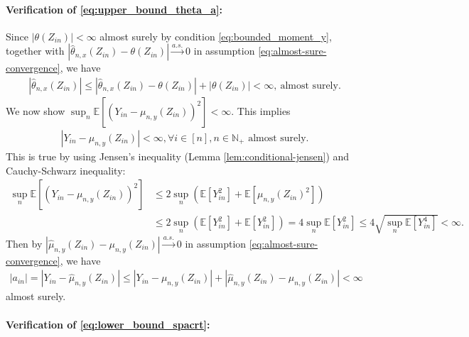 \documentclass[12pt]{article}
\theoremstyle{definition}
\newcommand{\E}{\mathbb E}								%
\newcommand{\srz}{Z}									%
\newcommand{\sry}{Y}									%
\begin{document}
	\paragraph{Verification of \eqref{eq:upper_bound_theta_a}:}
  Since $|\theta(\srz_{in})|<\infty$ almost surely by condition \eqref{eq:bounded_moment_y}, together with $|\widehat \theta_{n,x}(\srz_{in})-\theta(\srz_{in})|\overset{a.s.}{\rightarrow}0$ in assumption \eqref{eq:almost-sure-convergence}, we have
	\begin{align*}
		|\widehat \theta_{n,x}(\srz_{in})|\leq |\widehat \theta_{n,x}(\srz_{in})-\theta(\srz_{in})|+|\theta(\srz_{in})|<\infty,\ \text{almost surely}.
	\end{align*}
	We now show $\sup_n\E[(\sry_{in}-\mu_{n,y}(\srz_{in}))^2]<\infty$. This implies 
	\begin{align}\label{eq:bounded_y}
		|\sry_{in}-\mu_{n,y}(\srz_{in})|<\infty,\forall i\in [n],n\in\mathbb{N}_+\text{ almost surely}.
	\end{align}
	This is true by using Jensen's inequality (Lemma \ref{lem:conditional-jensen}) and Cauchy-Schwarz inequality:
	\begin{align*}
		\sup_n\E[(\sry_{in}-\mu_{n,y}(\srz_{in}))^2]
		&
		\leq 2\sup_n(\E[\sry_{in}^2]+\E[\mu_{n,y}(\srz_{in})^2])\\
		&
		\leq 2\sup_n(\E[\sry_{in}^2]+\E[\sry_{in}^2])=4\sup_n\E[\sry_{in}^2]\leq 4\sqrt{\sup_n\E[\sry_{in}^4]}<\infty.
	\end{align*}
	Then by $|\widehat{\mu}_{n,y}(\srz_{in})-\mu_{n,y}(\srz_{in})|\overset{a.s.}{\rightarrow}0$ in assumption \eqref{eq:almost-sure-convergence}, we have 
	\begin{align*}
		|a_{in}|=|\sry_{in}-\widehat{\mu}_{n,y}(\srz_{in})|\leq |\sry_{in}-\mu_{n,y}(\srz_{in})|+ |\widehat{\mu}_{n,y}(\srz_{in})-\mu_{n,y}(\srz_{in})|<\infty
	\end{align*}
	almost surely. 

	\paragraph{Verification of \eqref{eq:lower_bound_spacrt}:}
\end{document}
